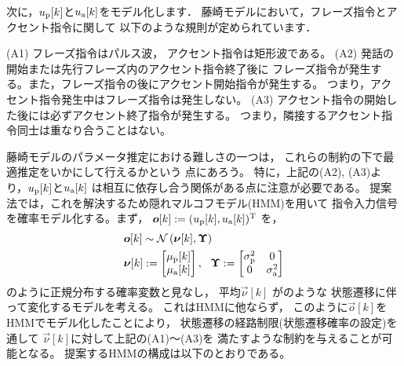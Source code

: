 
次に，${u}_{\rm p}[k]$と${u}_{\rm a}[k]$をモデル化します．
藤崎モデルにおいて，フレーズ指令とアクセント指令に関して
以下のような規則が定められています．

(A1) フレーズ指令はパルス波，
アクセント指令は矩形波である。
(A2) 発話の開始または先行フレーズ内のアクセント指令終了後に
フレーズ指令が発生する。また，フレーズ指令の後にアクセント開始指令が発生する。
つまり，アクセント指令発生中はフレーズ指令は発生しない。
(A3) アクセント指令の開始した後には必ずアクセント終了指令が発生する。
つまり，隣接するアクセント指令同士は重なり合うことはない。

藤崎モデルのパラメータ推定における難しさの一つは，
これらの制約の下で最適推定をいかにして行えるかという
点にあろう。
特に，上記の(A2), (A3)より，${u}_{\rm p}[k]$と${u}_{\rm a}[k]$
は相互に依存し合う関係がある点に注意が必要である。
提案法では，これを解決するため隠れマルコフモデル(HMM)を用いて
指令入力信号を確率モデル化する。まず，
$\Vec{o}[k]:=({u}_{\rm p}[k], {u}_{\rm a}[k])^{\rm T}$
を，
\begin{align}
&\Vec{o}[k]\sim\mathcal{N}
\left(\Vec{\nu}[k],\Vec{\Upsilon}\right)
\label{eq:TimeVaryingGauss}
\\
&\Vec{\nu}[k]:=
\begin{bmatrix}
\mu_{\rm p}[k]\\
\mu_{\rm a}[k]
\end{bmatrix}
,~~
\Vec{\Upsilon}:=
\begin{bmatrix}
\sigma_{\rm p}^2&0\\
0&\sigma_{\rm a}^2
\label{eq:TimeVaryingGauss2}
\end{bmatrix}
\end{align}
のように正規分布する確率変数と見なし，
平均$\Vec{\nu}[k]$
がのような
状態遷移に伴って変化するモデルを考える。
これはHMMに他ならず，
このように$\Vec{o}[k]$を
HMMでモデル化したことにより，
状態遷移の経路制限(状態遷移確率の設定)を通して
$\Vec{\nu}[k]$に対して上記の(A1)～(A3)を
満たすような制約を与えることが可能となる。
提案するHMMの構成は以下のとおりである。

